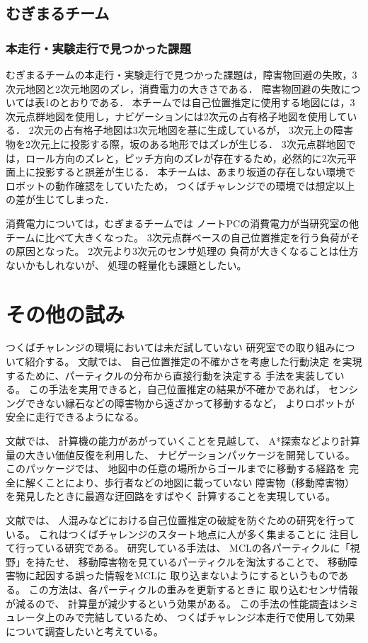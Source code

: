\documentclass[twocolumn,9pt]{jsproceedings}
\begin{document}
\subsection{むぎまるチーム}
\subsubsection{本走行・実験走行で見つかった課題}

むぎまるチームの本走行・実験走行で見つかった課題は，障害物回避の失敗，3次元地図と2次元地図のズレ，消費電力の大きさである．
障害物回避の失敗については表1のとおりである．
本チームでは自己位置推定に使用する地図には，3次元点群地図を使用し，ナビゲーションには2次元の占有格子地図を使用している．
2次元の占有格子地図は3次元地図を基に生成しているが，
3次元上の障害物を2次元上に投影する際，坂のある地形ではズレが生じる．
3次元点群地図では，ロール方向のズレと，ピッチ方向のズレが存在するため，必然的に2次元平面上に投影すると誤差が生じる．
本チームは、あまり坂道の存在しない環境でロボットの動作確認をしていたため，
つくばチャレンジでの環境では想定以上の差が生じてしまった．

消費電力については，むぎまるチームでは
ノートPCの消費電力が当研究室の他チームに比べて大きくなった。
3次元点群ベースの自己位置推定を行う負荷がその原因となった。
2次元より3次元のセンサ処理の
負荷が大きくなることは仕方ないかもしれないが、
処理の軽量化も課題としたい。

\section{その他の試み}

つくばチャレンジの環境においては未だ試していない
研究室での取り組みについて紹介する。
文献\cite{上田2023}では、
自己位置推定の不確かさを考慮した行動決定
を実現するために、パーティクルの分布から直接行動を決定する
手法を実装している。
この手法を実用できると，自己位置推定の結果が不確かであれば，
センシングできない縁石などの障害物から遠ざかって移動するなど，
よりロボットが安全に走行できるようになる。

文献\cite{tonouchi2023}\cite{ueda2023JRM}では、
計算機の能力があがっていくことを見越して、
A*探索などより計算量の大きい価値反復を利用した、
ナビゲーションパッケージを開発している。
このパッケージでは、
地図中の任意の場所からゴールまでに移動する経路を
完全に解くことにより、歩行者などの地図に載っていない
障害物（移動障害物）を発見したときに最適な迂回路をすばやく
計算することを実現している。



文献\cite{ikebeMECH}では、
人混みなどにおける自己位置推定の破綻を防ぐための研究を行っている。
これはつくばチャレンジのスタート地点に人が多く集まることに
注目して行っている研究である。
研究している手法は、
MCLの各パーティクルに「視野」を持たせ、
移動障害物を見ているパーティクルを淘汰することで、
移動障害物に起因する誤った情報をMCLに
取り込まないようにするというものである。
この方法は、各パーティクルの重みを更新するときに
取り込むセンサ情報が減るので、
計算量が減少するという効果がある。
この手法の性能調査はシミュレータ上のみで完結しているため、
つくばチャレンジ本走行で使用して効果について調査したいと考えている。
\end{document}
